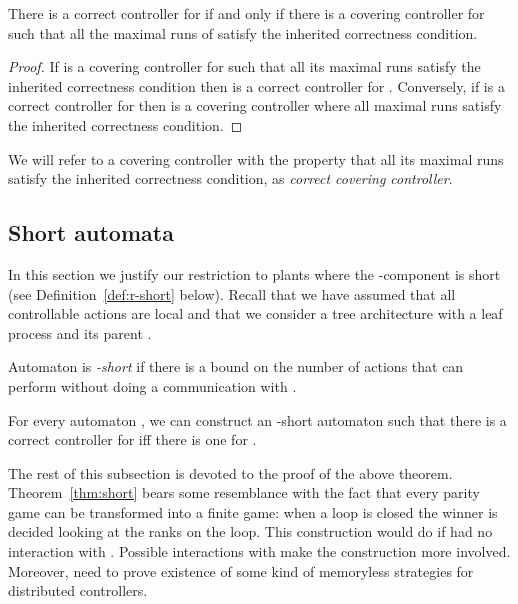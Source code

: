 \documentclass[10pt,a4paper]{article}
\begin{document}
\begin{lemma}\label{lemma:covering}
  There is a correct controller for  if and only if there is a
  covering controller  for  such that all the maximal runs
  of  satisfy the inherited correctness condition.
\end{lemma}

\begin{proof}
  If  is a covering
controller for  such that all its 
  maximal runs satisfy the inherited correctness condition then
   is a correct controller for . 
Conversely, if  is a correct controller for  then
   is a covering controller where all maximal runs
  satisfy the inherited correctness condition.
\end{proof}

We will refer to a covering controller with the
property that  all its
maximal runs satisfy the inherited correctness condition, as 
\emph{correct covering controller}.

\subsection{Short automata}\label{sec:short}

In this section we justify our restriction to plants  where the
-component  is short (see Definition~\ref{def:r-short}
below).  Recall that we have assumed that all controllable actions are
local and that we consider a tree architecture with a leaf process 
and its parent .

\begin{definition}[-short]\label{def:r-short}
 Automaton  is \emph{-short} if there
  is a bound on the number of actions that  can perform without
  doing a communication with . 
\end{definition}



\begin{theorem}\label{thm:short}
  For every automaton , we can construct an -short automaton
   such that there is a correct controller for  iff
  there is one for .
\end{theorem}
The rest of this subsection is devoted to the proof of the above theorem.
Theorem~\ref{thm:short} bears some resemblance with the fact that
every parity game can be transformed into a finite game: when a loop
is closed the winner is decided looking at the ranks on the loop. This
construction would do if  had no interaction with . Possible
interactions with  make the construction more involved. Moreover,
need to prove existence of some kind of memoryless strategies for
distributed controllers.
\end{document}
